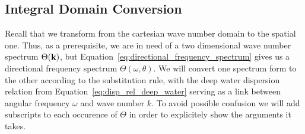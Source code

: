 \subsection{Integral Domain Conversion}
Recall that we transform from the cartesian wave number domain to the spatial 
one. Thus, as a prerequisite, we are in need of a two dimensional wave number 
spectrum $\Theta(\mathbf{k})$, but 
Equation~\ref{eq:directional_frequency_spectrum} 
gives us a directional frequency spectrum $\Theta(\omega,\theta)$. We will 
convert one spectrum form to the other according to the substitution rule, with 
the deep water dispersion relation from Equation~\ref{eq:disp_rel_deep_water} 
serving as a link between angular frequency $\omega$ and wave number $k$. To 
avoid possible confusion we will add subscripts to each occurence of $\Theta$ 
in order to explicitely show the arguments it takes.\\

